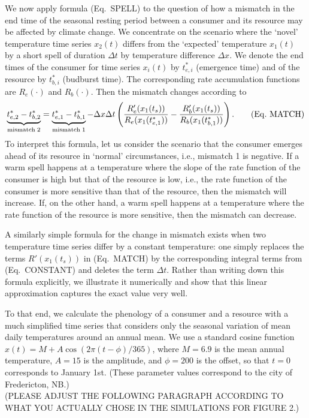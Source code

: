 \documentclass[11pt,letterpaper]{article}
\begin{document}
We now apply formula (Eq.~SPELL) to the question of how a mismatch in the end time of the seasonal resting period between a consumer and its resource may be affected by climate change. We concentrate on the scenario where the `novel' temperature time series $x_2(t)$ differs from the `expected' temperature $x_1(t)$ by a short spell of duration $\Delta t$ by temperature difference $\Delta x$. We denote the end times of the consumer for time series $x_i(t)$ by $t_{e,i}^*$ (emergence time) and of the resource by $t_{b,i}^*$ (budburst time). The corresponding rate accumulation functions are $R_e(\cdot)$ and $R_b(\cdot)$. Then the mismatch changes according to
\[
\underbrace{t_{e,2}^* - t_{b,2}^*}_{{\rm mismatch\; 2}} = \underbrace{t_{e,1}^* - t_{b,1}^*}_{{\rm mismatch\; 1}}-\Delta x\Delta t\left(\frac{R_e'(x_1(t_s))}{R_e(x_1(t_{e,1}^*))} - \frac{R_b'(x_1(t_s))}{R_b(x_1(t_{b,1}^*))}\right). \qquad ({\rm Eq.~MATCH})
\]
To interpret this formula, let us consider the scenario that the consumer emerges ahead of its resource in `normal' circumstances, i.e., mismatch 1 is negative. If a warm spell happens at a temperature where the slope of the rate function of the consumer is high but that of the resource is low, i.e., the rate function of the consumer is more sensitive than that of the resource, then the mismatch will increase. If, on the other hand, a warm spell happens at a temperature where the rate function of the resource is more sensitive, then the mismatch can decrease. 

A similarly simple formula for the change in mismatch exists when two temperature time series differ by a constant temperature: one simply replaces the terms $R'(x_1(t_s))$ in (Eq.~MATCH) by the corresponding integral terms from (Eq.~CONSTANT) and deletes the term $\Delta t$. Rather than writing down this formula explicitly, we illustrate it numerically and show that this linear approximation captures the exact value very well. 

To that end, we calculate the phenology of a consumer and a resource with a much simplified time series that considers only the seasonal variation of mean daily temperatures around an annual mean. We use a standard cosine function $x(t)=M+A\cos(2\pi(t-\phi)/365)$, where $M=6.9$ is the mean annual temperature, $A=15$ is the amplitude, and $\phi=200$ is the offset, so that $t=0$ corresponds to January 1st. (These parameter values correspond to the city of Fredericton, NB.) \\

(PLEASE ADJUST THE FOLLOWING PARAGRAPH ACCORDING TO WHAT YOU ACTUALLY CHOSE IN THE SIMULATIONS FOR FIGURE 2.)
\end{document}
